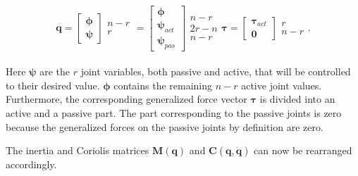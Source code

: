 \begin{subequations}
\begin{equation}
    \mathbf{q} = 
    \begin{bmatrix}
        \boldsymbol{\phi} \\ \boldsymbol{\psi}
    \end{bmatrix}
    \begin{matrix}
        n-r\\r
    \end{matrix}
    =
    \begin{bmatrix}
        \boldsymbol{\phi} \\ \boldsymbol{\psi}_{act} \\ \boldsymbol{\psi}_{pas}
    \end{bmatrix}
    \begin{matrix}
        n-r\\2r-n \\n-r
    \end{matrix}
\end{equation}
\begin{equation}
    \boldsymbol{\tau} = 
    \begin{bmatrix}
        \boldsymbol{\tau}_{act} \\ \mathbf{0}
    \end{bmatrix}
    \begin{matrix}
        r\\n-r
    \end{matrix}.
\end{equation}
\end{subequations}
\\
Here $\boldsymbol{\psi}$ are the $r$ joint variables, both passive and active, that will be controlled to their desired value. $\boldsymbol{\phi}$ contains the remaining $n-r$ active joint values. Furthermore, the corresponding generalized force vector $\boldsymbol{\tau}$ is divided into an active and a passive part. The part corresponding to the passive joints is zero because the generalized forces on the passive joints by definition are zero.

The inertia and Coriolis matrices $\mathbf{M(q)}$ and $\mathbf{C(q,\dot{q})}$ can now be rearranged accordingly.

